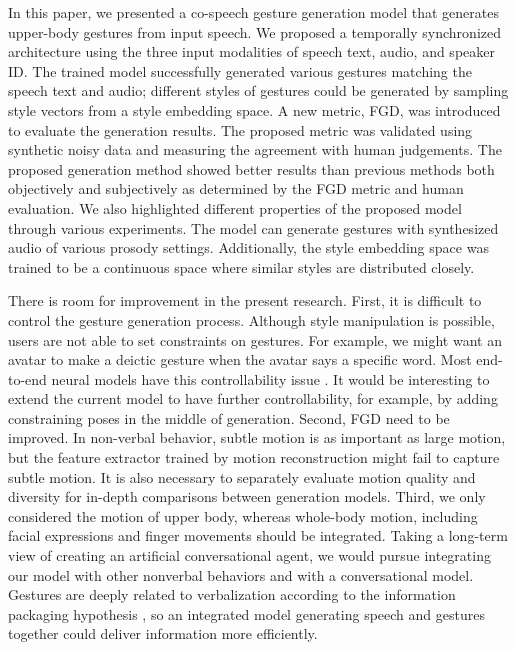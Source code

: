 \documentclass[acmtog]{acmart}
\begin{document}
In this paper, we presented a co-speech gesture generation model that generates upper-body gestures from input speech. We proposed a temporally synchronized architecture using the three input modalities of speech text, audio, and speaker ID. The trained model successfully generated various gestures matching the speech text and audio; different styles of gestures could be generated by sampling style vectors from a style embedding space. A new metric, FGD, was introduced to evaluate the generation results. The proposed metric was validated using synthetic noisy data and measuring the agreement with human judgements. The proposed generation method showed better results than previous methods both objectively and subjectively as determined by the FGD metric and human evaluation. We also highlighted different properties of the proposed model through various experiments. The model can generate gestures with synthesized audio of various prosody settings. Additionally, the style embedding space was trained to be a continuous space where similar styles are distributed closely.

There is room for improvement in the present research. First, it is difficult to control the gesture generation process. Although style manipulation is possible, users are not able to set constraints on gestures. For example, we might want an avatar to make a deictic gesture when the avatar says a specific word. Most end-to-end neural models have this controllability issue \cite{jahanian2019steerability}. It would be interesting to extend the current model to have further controllability, for example, by adding constraining poses in the middle of generation. Second, FGD need to be improved. In non-verbal behavior, subtle motion is as important as large motion, but the feature extractor trained by motion reconstruction might fail to capture subtle motion. It is also necessary to separately evaluate motion quality and diversity for in-depth comparisons between generation models. Third, we only considered the motion of upper body, whereas whole-body motion, including facial expressions and finger movements should be integrated. Taking a long-term view of creating an artificial conversational agent, we would pursue integrating our model with other nonverbal behaviors and with a conversational model. Gestures are deeply related to verbalization according to the information packaging hypothesis \cite{kita2000representational}, so an integrated model generating speech and gestures together could deliver information more efficiently. 
\end{document}

